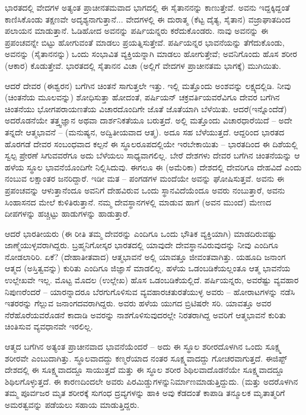 ಭಾರತದಲ್ಲಿ ವೇದಗಳ ಅತ್ಯಂತ ಪ್ರಾಚೀನತಮವಾದ ಭಾಗದಲ್ಲಿ ಈ ಸೈತಾನನನ್ನು ಕಾಣುತ್ತೇವೆ. ಅವನು ಇದ್ದಕ್ಕಿದ್ದಂತೆ ಕಾಣಿಸಿಕೊಂಡು ತಕ್ಷಣವೇ ಅದೃಶ್ಯನಾಗುತ್ತಾನೆ... ವೇದಗಳಲ್ಲಿ ಈ ದುರಾತ್ಮ (ಕೆಟ್ಟ ದೈತ್ಯ, ಸೈತಾನ) ವಜ್ರಾಘಾತದಿಂದ ಪಲಾಯನ ಮಾಡುತ್ತಾನೆ. ಓಡಿಹೋದ ಅವನನ್ನು ಪರ್ಷಿಯನ್ನರು ಕರೆದುಕೊಂಡರು. ನಾವು ಅವನನ್ನು ಈ ಪ್ರಪಂಚವನ್ನೇ ಬಿಟ್ಟು ಹೋಗುವಂತೆ ಮಾಡಲು ಪ್ರಯತ್ನಿಸುತ್ತೇವೆ. ಪರ್ಷಿಯನ್ನರ ಭಾವನೆಯನ್ನು ತೆಗೆದುಕೊಂಡು, ಅವನನ್ನು (ಸೈತಾನನನ್ನು) ಒಂದು ಸಂಭಾವಿತ ವ್ಯಕ್ತಿಯನ್ನಾಗಿ ಮಾಡಲು ಹೋಗುತ್ತೇವೆ; ಅವನಿಗೊಂದು ಹೊಸ ಶರೀರ (ಆಕಾರ) ಕೊಡುತ್ತೇವೆ. ಭಾರತದಲ್ಲಿ ಸೈತಾನನ ವಿಚಾ (ಅಲ್ಲಿಗೆ ವೇದಗಳ ಪ್ರಾಚೀನತಮ ಭಾಗಕ್ಕೆ) ಮುಗಿಯಿತು.

ಆದರೆ ದೇವರ (ಈಶ್ವರನ) ಬಗೆಗಿನ ಚಿಂತನೆ ಸಾಗುತ್ತಲೇ ಇತ್ತು. ಇಲ್ಲಿ ಮತ್ತೊಂದು ಅಂಶವನ್ನು ಲಕ್ಷ್ಯದಲ್ಲಿಡಿ. ನೀವು (ಚಿಂತನೆಯ ಮೂಲವನ್ನು) ಶೋಧಿಸುತ್ತಾ ಹೋದಂತೆ, ಪರ್ಷಿಯನ್ ಚಕ್ರವರ್ತಿಯವರೆವಿಗೂ ದೇವರ ಬಗೆಗಿನ ಚಿಂತನೆಯು ಭೋಗ\break ಪರಾಯಣತೆಯ ವಿಚಾರದೊಂದಿಗೇ ಜೊತೆ ಜೊತೆಯಾಗಿ ಬೆಳೆಯಿತು. ಆದರೆ\break (ಇನ್ನೊಂದೆಡೆ) ಅದರೊಡನೆಯೇ ತತ್ತ್ವಜ್ಞಾನ ಅಥವಾ ದಾರ್ಶನಿಕತೆಯೂ ಬರುತ್ತದೆ. ಅಲ್ಲಿ ಮತ್ತೊಂದು ವಿಚಾರಧಾರೆಯಿದೆ – ಅದೇ ತನ್ನದೇ ಆತ್ಮಭಾವನೆ – (ಮನುಷ್ಯನ, ಅದ್ವಿತೀಯವಾದ ಆತ್ಮ). ಅದೂ ಸಹ ಬೆಳೆಯುತ್ತದೆ. ಆದ್ದರಿಂದ ಭಾರತದ ಹೊರಗಡೆ ದೇವರ ಸಂಬಂಧವಾದ ಕಲ್ಪನೆ ಈ ಸ್ಥೂಲರೂಪದಲ್ಲಿಯೇ ಇರಬೇಕಾಯಿತು – ಭಾರತದಿಂದ ಈ ದಿಶೆಯಲ್ಲಿ ಸ್ವಲ್ಪ ಪ್ರೇರಣೆ ಸಿಗುವವರೆಗೂ ಅದು ಬೆಳೆಯಲು ಸಾಧ್ಯವಾಗಲಿಲ್ಲ. ಬೇರೆ ದೇಶಗಳು ದೇವರ ಬಗೆಗಿನ ಚಿಂತನೆಯನ್ನು ಆ ಹಳೆಯ ಸ್ಥೂಲ ಭಾವನೆಯೊಂದಿಗೇ ನಿಲ್ಲಿಸಿದುವು. ಈಗಲೂ ಈ (ಅಮೆರಿಕಾ) ದೇಶದಲ್ಲಿ ದೇವರಿಗೂ ದೇಹವಿದೆ ಎಂದು ನಂಬುವ ಲಕ್ಷಾಂತರ ಜನರಿದ್ದಾರೆ. ಇಡೀ ಮತ – ಪಂಗಡಗಳ ಮಂದೆಯೇ ಅವನ್ನು ಘೋಷಿಸುತ್ತವೆ. ಅವನು ಈ ಪ್ರಪಂಚವನ್ನು ಆಳುತ್ತಾನೆಂದೂ ಅವನಿಗೆ ದೇಹವಿರುವ ಒಂದು ಸ್ಥಾನವಿದೆಯೆಂದೂ ಅವರು ನಂಬುತ್ತಾರೆ, ಅವನು ಸಿಂಹಾಸನದ ಮೇಲೆ ಕುಳಿತಿರುತ್ತಾನೆ. ನಮ್ಮ ದೇವಸ್ಥಾನಗಳಲ್ಲಿ ಮಾಡುವ ಹಾಗೆ (ಅವನ ಮುಂದೆ) ಮೇಣದ ದೀಪಗಳನ್ನು ಹಚ್ಚಿಟ್ಟು ಹಾಡುಗಳನ್ನು ಹಾಡುತ್ತಾರೆ.

ಆದರೆ ಭಾರತೀಯರು (ಈ ರೀತಿ ತಮ್ಮ ದೇವರನ್ನು ಎಂದಿಗೂ ಒಂದು ಭೌತಿಕ ವ್ಯಕ್ತಿಯಾಗಿ) ಮಾಡದಿರುವಷ್ಟು ಜಾಣ್ಮೆಯುಳ್ಳವರಾಗಿದ್ದರು. ಬ್ರಹ್ಮನಿಗೋಸ್ಕರ ಭಾರತದಲ್ಲಿ ಯಾವುದೇ ದೇವಸ್ಥಾನವಿರುವುದನ್ನು ನೀವು ಎಂದಿಗೂ ನೋಡಲಾರಿರಿ. ಏಕೆ? (ದೇಹಾತೀತವಾದ) ಆತ್ಮಭಾವನೆ ಅಲ್ಲಿ ಯಾವತ್ತೂ ಜೀವಂತವಾಗಿತ್ತು. ಯಹೂದಿ ಜನಾಂಗ ಆತ್ಮದ (ಅಸ್ತಿತ್ವವನ್ನು) ಕುರಿತು ಎಂದಿಗೂ ಜಿಜ್ಞಾಸೆ ಮಾಡಲಿಲ್ಲ. ಹಳೆಯ ಒಡಂಬಡಿಕೆಯಲ್ಲಂತೂ ಆತ್ಮ ಭಾವನೆಯ ಉಲ್ಲೇಖವೇ ಇಲ್ಲ. ಮೊಟ್ಟ ಮೊದಲ (ಉಲ್ಲೇಖ) ಹೊಸ ಒಡಂಬಡಿಕೆಯಲ್ಲಿದೆ. ಪರ್ಷಿಯನ್ನರು, ಅವರೆಷ್ಟು ವ್ಯವಹಾರ ನಿಪುಣರೆಂದರೆ – ಯಾರನ್ನಾದರೂ ಬೆರಗುಗೊಳಿಸುವ ವ್ಯವಹಾರಚತುರತೆಯುಳ್ಳ ಅವರು – ಹೋರಾಟಗಳನ್ನು ನಡೆಸಿ ಇತರರನ್ನು ಗೆಲ್ಲುವ ಜನಾಂಗದವರಾಗಿದ್ದರು. ಅವರು ಹಳೆಯ ಯುಗದ ಬ್ರಿಟಿಷರೇ ಸರಿ. ಯಾವತ್ತೂ ಅವರ ನೆರೆಹೊರೆಯವರೊಡನೆ ಕಾದಾಡಿ ಅವರನ್ನು ನಾಶಗೊಳಿಸುವುದರಲ್ಲೇ ನಿರತರಾಗಿದ್ದ ಅವರಿಗೆ ಆತ್ಮಭಾವನೆ ಕುರಿತು ಚಿಂತಿಸುವ ವ್ಯವಧಾನವೇ ಇರಲಿಲ್ಲ.

ಆತ್ಮದ ಬಗೆಗಿನ ಅತ್ಯಂತ ಪ್ರಾಚೀನವಾದ ಭಾವನೆಯೆಂದರೆ – ಅದು ಈ ಸ್ಥೂಲ ಶರೀರದೊಳಗಿನ ಒಂದು ಸೂಕ್ಷ್ಮ ಶರೀರವೇ ಎಂಬುದಾಗಿತ್ತು. ಸ್ಥೂಲವಾದದ್ದು ಕಣ್ಮರೆಯಾದ ನಂತರ ಸೂಕ್ಷ್ಮವಾದದ್ದು ಗೋಚರವಾಗುತ್ತದೆ. ಈಜಿಪ್ಟ್ ದೇಶದಲ್ಲಿ ಈ ಸೂಕ್ಷ್ಮವಾದದ್ದೂ ಸಾಯುತ್ತದೆ ಮತ್ತು ಈ ಸ್ಥೂಲ ಶರೀರ ಶಿಥಿಲವಾದೊಡನೆಯೇ ಸೂಕ್ಷ್ಮವಾದದ್ದೂ ಶಿಥಿಲಗೊಳ್ಳುತ್ತದೆ. ಈ ಕಾರಣದಿಂದಲೇ ಅವರು ಪಿರಮಿಡ್ಡುಗಳನ್ನು\break ನಿರ್ಮಾಣಮಾಡುತ್ತಿದ್ದುದು. (ಮತ್ತು ಅದರೊಳಗಿನ ತಮ್ಮ ಪೂರ್ವಜರ ಮೃತ ಶರೀರಕ್ಕೆ ಸುಗಂಧ ದ್ರವ್ಯಗಳನ್ನು ಹಾಕಿ ಅವು ಕೆಡದಂತೆ ಕಾಪಾಡಿ ತನ್ಮೂಲಕ ಮೃತಾತ್ಮರಿಗೆ ಅಮರತ್ವವನ್ನು ಪಡೆಯಲು ಸಹಾಯ ಮಾಡುತ್ತಿದ್ದರು.

